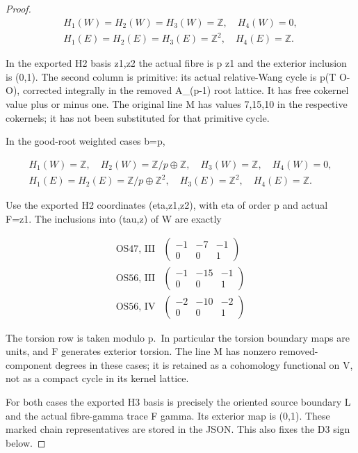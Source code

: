 \begin{proof}
\[
\begin{gathered}H_1(W)=H_2(W)=H_3(W)=\mathbb Z,\quad H_4(W)=0,\\ H_1(E)=H_2(E)=H_3(E)=\mathbb Z^2,\quad H_4(E)=\mathbb Z.\end{gathered}
\]

In the exported H2 basis z1,z2 the actual fibre is p z1 and
the exterior inclusion is (0,1). The second column is primitive:
its actual relative-Wang cycle is p(T O-O), corrected integrally
in the removed A\_(p-1) root lattice. It has free cokernel value
plus or minus one. The original line M has values 7,15,10 in
the respective cokernels; it has not been substituted for that
primitive cycle.

In the good-root weighted cases b=p,

\[
\begin{gathered}H_1(W)=\mathbb Z,\quad H_2(W)=\mathbb Z/p\oplus\mathbb Z,\quad H_3(W)=\mathbb Z,\quad H_4(W)=0,\\ H_1(E)=H_2(E)=\mathbb Z/p\oplus\mathbb Z^2,\quad H_3(E)=\mathbb Z^2,\quad H_4(E)=\mathbb Z.\end{gathered}
\]

Use the exported H2 coordinates (eta,z1,z2), with eta of order
p and actual F=z1. The inclusions into (tau,z) of W are exactly

\[
\begin{array}{c|c}\text{OS47, III}&\begin{pmatrix}-1&-7&-1\\0&0&1\end{pmatrix}\\[3pt]\text{OS56, III}&\begin{pmatrix}-1&-15&-1\\0&0&1\end{pmatrix}\\[3pt]\text{OS56, IV}&\begin{pmatrix}-2&-10&-2\\0&0&1\end{pmatrix}\end{array}\tag{OA.2}
\]

The torsion row is taken modulo p.~In particular the torsion
boundary maps are units, and F generates exterior torsion. The
line M has nonzero removed-component degrees in these cases;
it is retained as a cohomology functional on V, not as a compact
cycle in its kernel lattice.

For both cases the exported H3 basis is precisely the oriented
source boundary L and the actual fibre-gamma trace F gamma.
Its exterior map is (0,1). These marked chain representatives
are stored in the JSON. This also fixes the D3 sign below.


\end{proof}
